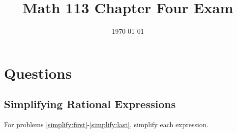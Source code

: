 \documentclass[fleqn,addpoints]{exam}
\title{Math 113 Chapter Four Exam}
\author{}
\date{\today}
\begin{document}
\maketitle

\ifprintanswers
\else
\vspace{0.2in}
\vspace{0.2in}

\begin{center}
\gradetable[h][pages]
\end{center}

\fi

\section{Questions}

\subsection{Simplifying Rational Expressions}

For problems \ref{simplify:first}-\ref{simplify:last}, simplify each expression.
\end{document}
